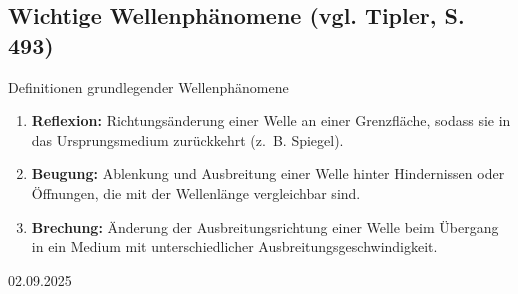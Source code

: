 \documentclass[11pt,a4paper,oneside]{article}
\newcommand{\lessondate}[1]{\noindent\hfill\textcolor{MarginalGray}{\textsc{#1}} \\ \vspace{0.5cm}}
\begin{document}
	
	\subsection*{Wichtige Wellenphänomene (vgl. Tipler, S. 493)}
	
	\begin{theo}{Definitionen grundlegender Wellenphänomene}
		\begin{enumerate}
			\item \textbf{Reflexion:} Richtungsänderung einer Welle an einer Grenzfläche, sodass sie in das Ursprungsmedium zurückkehrt (z.~B. Spiegel).
			\item \textbf{Beugung:} Ablenkung und Ausbreitung einer Welle hinter Hindernissen oder Öffnungen, die mit der Wellenlänge vergleichbar sind.
			\item \textbf{Brechung:} Änderung der Ausbreitungsrichtung einer Welle beim Übergang in ein Medium mit unterschiedlicher Ausbreitungsgeschwindigkeit.
		\end{enumerate}
	\end{theo}
	
	
	\newpage
	\lessondate{02.09.2025}\\
	
\end{document}
